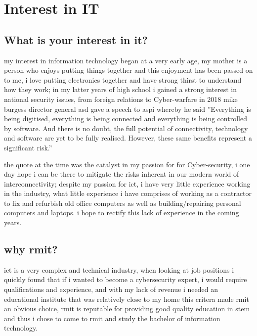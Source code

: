 \documentclass{article}
\begin{document}
\section{Interest in IT}


\subsection{What is your interest in it? }

my interest in information technology began at a very early age, my mother is a person who enjoys putting things together and this enjoyment has been passed on to me, i love putting electronics together and have strong thirst to understand how they work; in my latter years of high school i gained a strong interest in national security issues, from foreign relations to Cyber-warfare in 2018 mike burgess director general asd gave a speech to aspi whereby he said
 ''Everything is being digitised, everything is being connected and everything is being controlled by software. And there is no doubt, the full potential of connectivity, technology and software are yet to be fully realised. However, these same benefits represent a significant risk.''

the quote at the time was the catalyst in my passion for for Cyber-security, i one day hope i can be there to mitigate the risks inherent in our modern world of interconnectivity; despite my passion for ict, i have very little experience working in the industry, what little experience i have comprises of working as a contractor to fix and refurbish old office computers as well as building/repairing personal computers and laptops. i hope to rectify this lack of experience in the coming years.
\newline

\subsection{why rmit?}

ict is a very complex and technical industry, when looking at job positions i quickly found that if i wanted to become a cybersecurity expert, i would require qualifications and experience, and with my lack of revenue i needed an educational institute that was relatively close to my home this critera made rmit an obvious choice, rmit is reputable for providing good quality education in stem and thus i chose to come to rmit and study the bachelor of information technology.\newline
\end{document}
